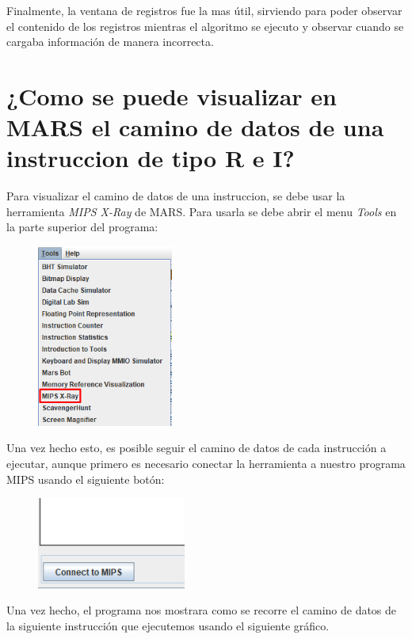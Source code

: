 \documentclass[titlepage]{article}
\begin{document}
Finalmente, la ventana de registros fue la mas útil, sirviendo para poder observar el contenido de los registros mientras el algoritmo se ejecuto y observar cuando se cargaba información de manera incorrecta.

\section*{¿Como se puede visualizar en MARS el camino de datos de una instruccion de tipo R e I?}

Para visualizar el camino de datos de una instruccion, se debe usar la herramienta \emph{MIPS X-Ray} de MARS. Para usarla se debe abrir el menu \emph{Tools} en la parte superior del programa:

\begin{figure}[ht]
    \centering
    \includegraphics[height=6cm]{images/step6.png} %
    \label{fig:step6}
\end{figure}

Una vez hecho esto, es posible seguir el camino de datos de cada instrucción a ejecutar, aunque primero es necesario conectar la herramienta a nuestro programa MIPS usando el siguiente botón:

\begin{figure}[ht]
    \centering
    \includegraphics[height=3cm]{images/step7.png} %
    \label{fig:step7}
\end{figure}

Una vez hecho, el programa nos mostrara como se recorre el camino de datos de la siguiente instrucción que ejecutemos usando el siguiente gráfico.
\end{document}
